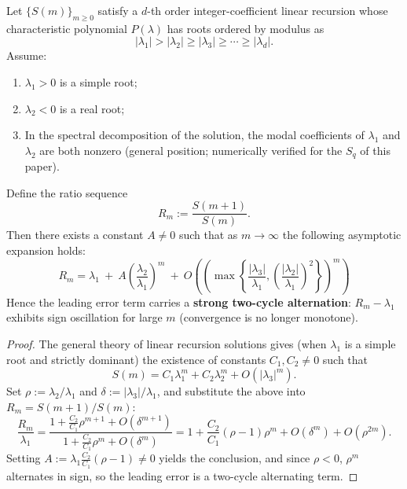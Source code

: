 \begin{proposition}\label{prop:pom-resonance-two-cycle-ratio}
Let \(\{S(m)\}_{m\ge 0}\) satisfy a \(d\)-th order integer-coefficient linear recursion whose characteristic polynomial \(P(\lambda)\) has roots ordered by modulus as
\[
|\lambda_1|>|\lambda_2|\ge|\lambda_3|\ge\cdots\ge|\lambda_d|.
\]
Assume:
\begin{enumerate}
  \item \(\lambda_1>0\) is a simple root;
  \item \(\lambda_2<0\) is a real root;
  \item In the spectral decomposition of the solution, the modal coefficients of \(\lambda_1\) and \(\lambda_2\) are both nonzero (general position; numerically verified for the \(S_q\) of this paper).
\end{enumerate}
Define the ratio sequence
\[
R_m:=\frac{S(m+1)}{S(m)}.
\]
Then there exists a constant \(A\neq 0\) such that as \(m\to\infty\) the following asymptotic expansion holds:
\[
\boxed{\;
R_m=\lambda_1\ +\ A\left(\frac{\lambda_2}{\lambda_1}\right)^{m}\ +\ O\!\left(\left(\max\!\left\{\frac{|\lambda_3|}{\lambda_1},\left(\frac{|\lambda_2|}{\lambda_1}\right)^2\right\}\right)^{m}\right)\;}
\]
Hence the leading error term carries a \textbf{strong two-cycle alternation}: \(R_m-\lambda_1\) exhibits sign oscillation for large \(m\) (convergence is no longer monotone).
\end{proposition}
\begin{proof}
The general theory of linear recursion solutions gives (when \(\lambda_1\) is a simple root and strictly dominant) the existence of constants \(C_1,C_2\neq 0\) such that
\[
S(m)=C_1\lambda_1^m+C_2\lambda_2^m+O(|\lambda_3|^m).
\]
Set \(\rho:=\lambda_2/\lambda_1\) and \(\delta:=|\lambda_3|/\lambda_1\), and substitute the above into
\(
R_m=S(m+1)/S(m)
\):
\[
\frac{R_m}{\lambda_1}
=\frac{1+\frac{C_2}{C_1}\rho^{m+1}+O(\delta^{m+1})}{1+\frac{C_2}{C_1}\rho^{m}+O(\delta^{m})}
=1+\frac{C_2}{C_1}(\rho-1)\rho^{m}+O(\delta^m)+O(\rho^{2m}).
\]
Setting \(A:=\lambda_1\frac{C_2}{C_1}(\rho-1)\neq 0\) yields the conclusion, and since \(\rho<0\), \(\rho^m\) alternates in sign, so the leading error is a two-cycle alternating term.
\end{proof}


